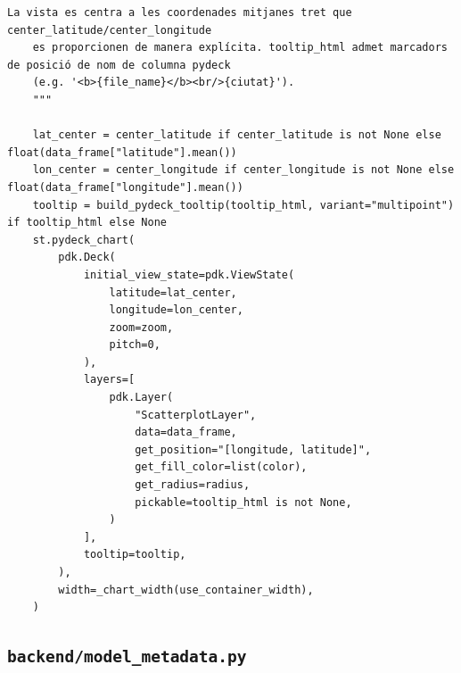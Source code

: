 \documentclass[10pt,a4paper]{article}
\begin{document}
\begin{lstlisting}[style=studioPython,caption={backend/mapa\_backend.py},label={lst:backend-mapa-backend-py}]
    La vista es centra a les coordenades mitjanes tret que center_latitude/center_longitude
    es proporcionen de manera explícita. tooltip_html admet marcadors de posició de nom de columna pydeck
    (e.g. '<b>{file_name}</b><br/>{ciutat}').
    """

    lat_center = center_latitude if center_latitude is not None else float(data_frame["latitude"].mean())
    lon_center = center_longitude if center_longitude is not None else float(data_frame["longitude"].mean())
    tooltip = build_pydeck_tooltip(tooltip_html, variant="multipoint") if tooltip_html else None
    st.pydeck_chart(
        pdk.Deck(
            initial_view_state=pdk.ViewState(
                latitude=lat_center,
                longitude=lon_center,
                zoom=zoom,
                pitch=0,
            ),
            layers=[
                pdk.Layer(
                    "ScatterplotLayer",
                    data=data_frame,
                    get_position="[longitude, latitude]",
                    get_fill_color=list(color),
                    get_radius=radius,
                    pickable=tooltip_html is not None,
                )
            ],
            tooltip=tooltip,
        ),
        width=_chart_width(use_container_width),
    )
\end{lstlisting}


\subsection{\texorpdfstring{\texttt{backend/model\_metadata.py}}{backend/model\_metadata.py}}
\end{document}

